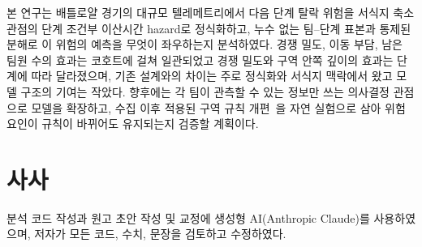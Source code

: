본 연구는 배틀로얄 경기의 대규모 텔레메트리에서 다음 단계 탈락 위험을 서식지 축소 관점의 단계 조건부 이산시간 hazard로 정식화하고, 누수 없는 팀--단계 표본과 통제된 분해로 이 위험의 예측을 무엇이 좌우하는지 분석하였다.
경쟁 밀도, 이동 부담, 남은 팀원 수의 효과는 코호트에 걸쳐 일관되었고 경쟁 밀도와 구역 안쪽 깊이의 효과는 단계에 따라 달라졌으며, 기존 설계와의 차이는 주로 정식화와 서식지 맥락에서 왔고 모델 구조의 기여는 작았다.
향후에는 각 팀이 관측할 수 있는 정보만 쓰는 의사결정 관점으로 모델을 확장하고, 수집 이후 적용된 구역 규칙 개편~\cite{PUBGBlueZone2026}을 자연 실험으로 삼아 위험 요인이 규칙이 바뀌어도 유지되는지 검증할 계획이다.

\section*{사사}
분석 코드 작성과 원고 초안 작성 및 교정에 생성형 AI(Anthropic Claude)를 사용하였으며, 저자가 모든 코드, 수치, 문장을 검토하고 수정하였다.
